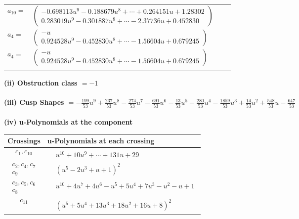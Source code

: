 \documentclass[1p]{elsarticle_modified}
\theoremstyle{definition}
\begin{document}
\begin{tabular}{m{7pt} m{180pt} m{7pt} m{180pt} }
\flushright $a_{10}=$&$\begin{pmatrix}-0.698113 u^{9}-0.188679 u^{8}+\cdots+0.264151 u+1.28302\\0.283019 u^{9}-0.301887 u^{8}+\cdots-2.37736 u+0.452830\end{pmatrix}$ \\
\flushright $a_{4}=$&$\begin{pmatrix}- u\\0.924528 u^{9}-0.452830 u^{8}+\cdots-1.56604 u+0.679245\end{pmatrix}$\\ \flushright $a_{4}=$&$\begin{pmatrix}- u\\0.924528 u^{9}-0.452830 u^{8}+\cdots-1.56604 u+0.679245\end{pmatrix}$\\&\end{tabular}
\flushleft \textbf{(ii) Obstruction class $= -1$}\\~\\
\flushleft \textbf{(iii) Cusp Shapes $= -\frac{199}{53} u^9+\frac{237}{53} u^8-\frac{274}{53} u^7-\frac{691}{53} u^6-\frac{13}{53} u^5+\frac{280}{53} u^4-\frac{1859}{53} u^3+\frac{14}{53} u^2+\frac{548}{53} u-\frac{647}{53}$}\\~\\
\newpage\renewcommand{\arraystretch}{1}
\flushleft \textbf{(iv) u-Polynomials at the component}\newline \\
\begin{tabular}{m{50pt}|m{274pt}}
Crossings & \hspace{64pt}u-Polynomials at each crossing \\
\hline $$\begin{aligned}c_{1},c_{10}\end{aligned}$$&$\begin{aligned}
&u^{10}+10 u^9+\cdots+131 u+29
\end{aligned}$\\
\hline $$\begin{aligned}c_{2},c_{4},c_{7}\\c_{9}\end{aligned}$$&$\begin{aligned}
&(u^5-2 u^3+u+1)^2
\end{aligned}$\\
\hline $$\begin{aligned}c_{3},c_{5},c_{6}\\c_{8}\end{aligned}$$&$\begin{aligned}
&u^{10}+4 u^7+4 u^6- u^5+5 u^4+7 u^3- u^2- u+1
\end{aligned}$\\
\hline $$\begin{aligned}c_{11}\end{aligned}$$&$\begin{aligned}
&(u^5+5 u^4+13 u^3+18 u^2+16 u+8)^2
\end{aligned}$\\
\hline
\end{tabular}\\~\\
\end{document}
